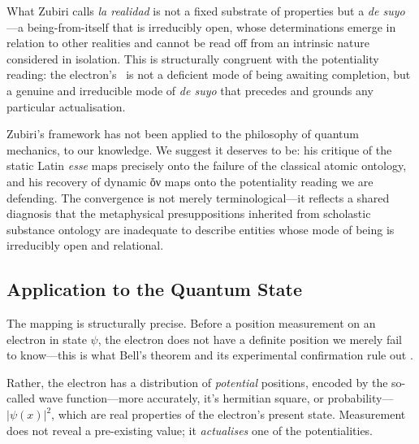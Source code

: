 \medskip

What Zubiri calls \textit{la realidad} is not a fixed substrate of properties but a \textit{de suyo}---a being-from-itself that is irreducibly open, whose determinations emerge in relation to other realities and cannot be read off from an intrinsic nature considered in isolation. This is structurally congruent with the potentiality reading: the electron's \dunamis\ is not a deficient mode of being awaiting completion, but a genuine and irreducible mode of \textit{de suyo} that precedes and grounds any particular actualisation.

\medskip

Zubiri's framework has not been applied to the philosophy of quantum mechanics, to our knowledge. We suggest it deserves to be: his critique of the static Latin \textit{esse} maps precisely onto the failure of the classical atomic ontology, and his recovery of dynamic \textgreek{ὄν} maps onto the potentiality reading we are defending. The convergence is not merely terminological---it reflects a shared diagnosis that the metaphysical presuppositions inherited from scholastic substance ontology are inadequate to describe entities whose mode of being is irreducibly open and relational.

\medskip


\subsection{Application to the Quantum State}

The mapping is structurally precise. Before a position measurement on an electron in state $\psi$, the electron does not have a definite position we merely fail to know---this is what Bell's theorem and its experimental confirmation rule out \cite{bell_1964_epr, aspect_1982_bell, hensen_2015_loophole}.

\medskip

Rather, the electron has a distribution of \textit{potential} positions, encoded by the so-called wave function---more accurately, it's hermitian square, or probability---$|\psi(x)|^2$, which are real properties of the electron's present state. Measurement does not reveal a pre-existing value; it \textit{actualises} one of the potentialities.

